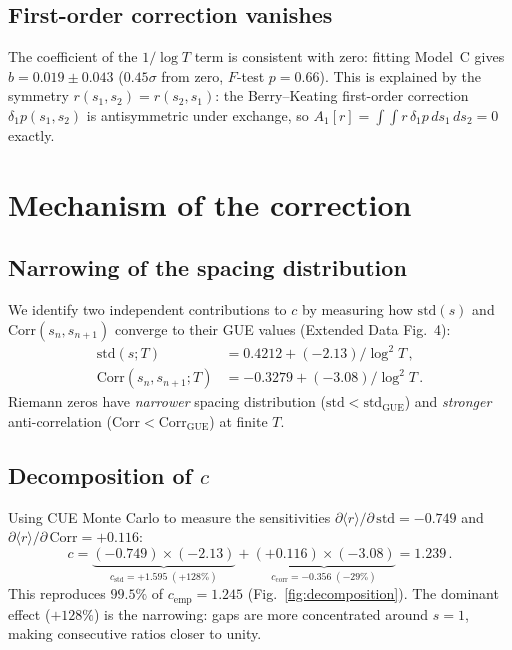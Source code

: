 \documentclass[10pt]{article}
\begin{document}
\subsection{First-order correction vanishes}

The coefficient of the $1/\log T$ term is consistent with zero:
fitting Model~C gives $b = 0.019 \pm 0.043$ ($0.45\sigma$ from zero,
$F$-test $p = 0.66$). This is explained by the symmetry
$r(s_1, s_2) = r(s_2, s_1)$: the Berry--Keating first-order correction
$\delta_1 p(s_1, s_2)$ is antisymmetric under exchange, so
$A_1[r] = \int\!\!\int r\,\delta_1 p\,ds_1\,ds_2 = 0$ exactly.


\section{Mechanism of the correction}

\subsection{Narrowing of the spacing distribution}

We identify two independent contributions to $c$ by measuring how
$\mathrm{std}(s)$ and $\mathrm{Corr}(s_n, s_{n+1})$ converge to their
GUE values (Extended Data Fig.~4):
\begin{align}
\mathrm{std}(s; T) &= 0.4212 + (-2.13)/\log^2 T\,,
\label{eq:std}\\
\mathrm{Corr}(s_n, s_{n+1}; T) &= -0.3279 + (-3.08)/\log^2 T\,.
\label{eq:corr}
\end{align}
Riemann zeros have \emph{narrower} spacing distribution
($\mathrm{std} < \mathrm{std}_{\mathrm{GUE}}$) and \emph{stronger}
anti-correlation ($\mathrm{Corr} < \mathrm{Corr}_{\mathrm{GUE}}$) at
finite $T$.

\subsection{Decomposition of $c$}

Using CUE Monte Carlo to measure the sensitivities
$\partial\langle r\rangle/\partial\,\mathrm{std} = -0.749$ and
$\partial\langle r\rangle/\partial\,\mathrm{Corr} = +0.116$:
\begin{equation}
c = \underbrace{(-0.749)\times(-2.13)}_{c_{\mathrm{std}} = +1.595\;(+128\%)}
+ \underbrace{(+0.116)\times(-3.08)}_{c_{\mathrm{corr}} = -0.356\;(-29\%)}
= 1.239\,.
\label{eq:decomposition}
\end{equation}
This reproduces $99.5\%$ of $c_{\mathrm{emp}} = 1.245$ (Fig.~\ref{fig:decomposition}).
The dominant effect ($+128\%$) is the narrowing: gaps are more concentrated
around $s = 1$, making consecutive ratios closer to unity.
\end{document}
